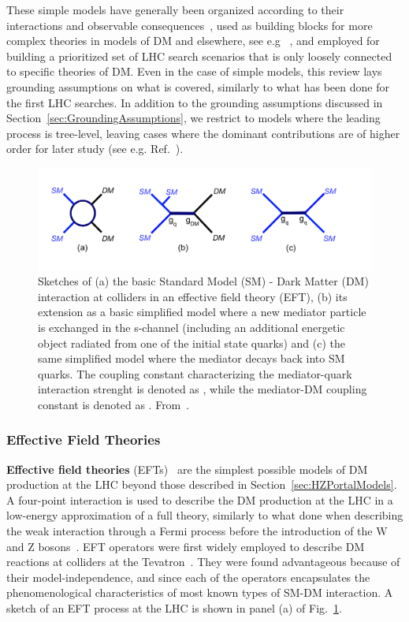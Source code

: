 These simple models have generally been organized according to their interactions and observable consequences~\cite{Goodman:2010ku,Abercrombie:2015wmb}, used as building blocks for more complex theories in models of DM and elsewhere, see e.g ~\cite{Alwall:2008ag, Agrawal:2010fh, Alves:2011wf, Choudhury:2015lha, Gutschow:2012pw}, and employed for building a prioritized set of LHC search scenarios that is only loosely connected to specific theories of DM. 
Even in the case of simple models, this review lays grounding assumptions on what is covered, similarly to what has been done for the first LHC searches. In addition to the grounding assumptions discussed in Section~\ref{sec:GroundingAssumptions}, we restrict to models where the leading process is tree-level, leaving cases where the dominant contributions are of higher order for later study (see e.g. Ref.~\cite{Godbole:2015gma}). 

\begin{figure}[!htpb]
\includegraphics[width=\textwidth]{figures/MonoX.pdf}
\caption{Sketches of (a) the basic Standard Model (SM) - Dark Matter (DM) interaction at colliders in an effective field theory (EFT), (b) its extension as a basic simplified model where a new mediator particle is exchanged in the s-channel (including an additional energetic object radiated from one of the initial state quarks) and (c) the same simplified model where the mediator decays back into SM quarks. The coupling constant characterizing the mediator-quark interaction strenght is denoted as \gq, while the mediator-DM coupling constant is denoted as \gdm. From~\cite{monoXfig}.}
\label{fig:monoX}
\end{figure}

\subsubsection{Effective Field Theories}

\textbf{Effective field theories} (EFTs)~\cite{Goodman:2010ku, Shoemaker:2011vi} are the simplest possible models of DM production at the LHC beyond those described in Section~\ref{sec:HZPortalModels}. A four-point interaction is used to describe the DM production at the LHC in a low-energy approximation of a full theory, similarly to what done when describing the weak interaction through a Fermi process before the introduction of the W and Z bosons~\cite{Fermi2008}. EFT operators were first widely employed to describe DM reactions at colliders at the Tevatron~\cite{Bai:2010hh,Beltran:2010ww}. They were found advantageous because of their model-independence, and since each of the operators encapsulates the phenomenological characteristics of most known types of SM-DM interaction. A sketch of an EFT process at the LHC is shown in panel (a) of Fig.~\ref{fig:monoX}. 

